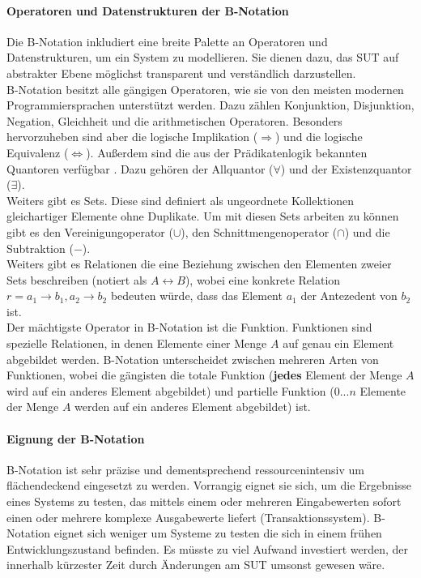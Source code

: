 \paragraph{Operatoren und Datenstrukturen der B-Notation}
Die B-Notation inkludiert eine breite Palette an Operatoren und Datenstrukturen, um ein System zu modellieren. Sie dienen dazu, das \gls{SUT} auf abstrakter Ebene möglichst transparent und verständlich darzustellen.\\
B-Notation besitzt alle gängigen Operatoren, wie sie von den meisten modernen Programmiersprachen unterstützt werden. Dazu zählen Konjunktion, Disjunktion, Negation, Gleichheit und die arithmetischen Operatoren. Besonders hervorzuheben sind aber die logische Implikation ($\Rightarrow$) und die logische Equivalenz ($\Leftrightarrow$). Außerdem sind die aus der Prädikatenlogik bekannten Quantoren verfügbar \cite{teschl_mathematik_2013}. Dazu gehören der Allquantor ($\forall$) und der Existenzquantor ($\exists$).\\
Weiters gibt es Sets. Diese sind definiert als ungeordnete Kollektionen gleichartiger Elemente ohne Duplikate. Um mit diesen Sets arbeiten zu können gibt es den Vereinigungoperator ($\cup$), den Schnittmengenoperator ($\cap$) und die Subtraktion ($-$).\\
Weiters gibt es Relationen die eine Beziehung zwischen den Elementen zweier Sets beschreiben (notiert als $A \leftrightarrow B$), wobei eine konkrete Relation $r = {a_1 \rightarrow b_1, a_2 \rightarrow b_2} $ bedeuten würde, dass das Element $a_1$ der Antezedent von $b_2$ ist.\\
Der mächtigste Operator in B-Notation ist die Funktion. Funktionen sind spezielle Relationen, in denen Elemente einer Menge $A$ auf genau ein Element abgebildet werden. B-Notation unterscheidet zwischen mehreren Arten von Funktionen, wobei die gängisten die totale Funktion (\textbf{jedes} Element der Menge $A$ wird auf ein anderes Element abgebildet) und partielle Funktion ($0...n$ Elemente der Menge $A$ werden auf ein anderes Element abgebildet) ist. 

\paragraph{Eignung der B-Notation}
B-Notation ist sehr präzise und dementsprechend ressourcenintensiv um flächendeckend eingesetzt zu werden. Vorrangig eignet sie sich, um die Ergebnisse eines Systems zu testen, das mittels einem oder mehreren Eingabewerten sofort einen oder mehrere komplexe Ausgabewerte liefert (Transaktionssystem). B-Notation eignet sich weniger um Systeme zu testen die sich in einem frühen Entwicklungszustand befinden. Es müsste zu viel Aufwand investiert werden, der innerhalb kürzester Zeit durch Änderungen am \Gls{SUT} umsonst gewesen wäre.

